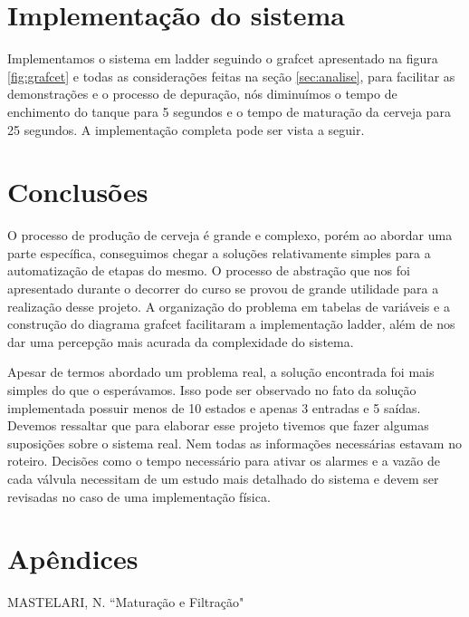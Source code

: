 \documentclass[12pt]{article}
\begin{document}
\section {Implementação do sistema}
\label{sec:ladder}
Implementamos o sistema em ladder seguindo o grafcet apresentado na figura \ref{fig:grafcet} e todas as considerações feitas na seção \ref{sec:analise}, para facilitar as demonstrações e o processo de depuração, nós diminuímos o tempo de enchimento do tanque para 5 segundos e o tempo de maturação da cerveja para 25 segundos. A implementação completa pode ser vista a seguir.



\section {Conclusões}
O processo de produção de cerveja é grande e complexo, porém ao abordar uma parte específica, conseguimos chegar a soluções relativamente simples para a automatização de etapas do mesmo. O processo de abstração que nos foi apresentado durante o decorrer do curso se provou de grande utilidade para a realização desse projeto. A organização do problema em tabelas de variáveis e a construção do diagrama grafcet facilitaram a implementação ladder, além de nos dar uma percepção mais acurada da complexidade do sistema.

Apesar de termos abordado um problema real, a solução encontrada foi mais simples do que o esperávamos. Isso pode ser observado no fato da solução implementada possuir menos de 10 estados e apenas 3 entradas e 5 saídas. Devemos ressaltar que para elaborar esse projeto tivemos que fazer algumas suposições sobre o sistema real. Nem todas as informações necessárias estavam no roteiro. Decisões como o tempo necessário para ativar os alarmes e a vazão de cada válvula necessitam de um estudo mais detalhado do sistema e devem ser revisadas no caso de uma implementação física.
\newpage
\appendix
\section{Apêndices}

\label{apx:table}


\label{apx:ihm}


\begin{thebibliography}{5}
	 MASTELARI, N. ``Maturação e Filtração"
\end{thebibliography}
\end{document}
